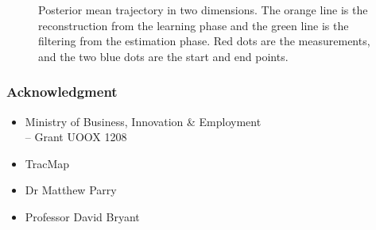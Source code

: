 \documentclass{beamer}
\begin{document}
\begin{frame}

\begin{figure}[h]
\centering
{}
\caption{Posterior mean trajectory in two dimensions. The orange line is the reconstruction from the learning phase and the green line is the filtering from the estimation phase. Red dots are the measurements, and the two blue dots are the start and end points.}
\end{figure} 
\end{frame}


\begin{frame}
\frametitle{Acknowledgment}
\begin{itemize}
\item Ministry of Business, Innovation \& Employment\\
 \hskip 0.5cm -- Grant UOOX 1208\\
\item TracMap\\
\item Dr Matthew Parry\\
\item Professor David Bryant
\end{itemize}
\end{frame}
\end{document}
